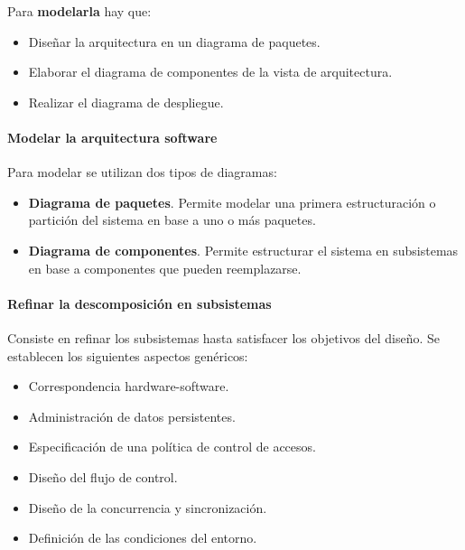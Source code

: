 \documentclass[12pt,spanish]{article}
\begin{document}
Para \textbf{modelarla} hay que:

\begin{itemize}
	\item Diseñar la arquitectura en un diagrama de paquetes.
	\item Elaborar el diagrama de componentes de la vista de arquitectura.
	\item Realizar el diagrama de despliegue.
\end{itemize}

\paragraph{Modelar la arquitectura software\\}

Para modelar se utilizan dos tipos de diagramas:

\begin{itemize}
	\item \textbf{Diagrama de paquetes}. Permite modelar una primera estructuración o partición del sistema en base a uno o más paquetes.
	\item \textbf{Diagrama de componentes}. Permite estructurar el sistema en subsistemas en base a componentes que pueden reemplazarse.
\end{itemize}

\paragraph{Refinar la descomposición en subsistemas\\}

Consiste en refinar los subsistemas hasta satisfacer los objetivos del diseño. Se establecen los siguientes aspectos genéricos:

\begin{itemize}
	\item Correspondencia hardware-software.
	\item Administración de datos persistentes.
	\item Especificación de una política de control de accesos.
	\item Diseño del flujo de control.
	\item Diseño de la concurrencia y sincronización.
	\item Definición de las condiciones del entorno.
\end{itemize}
\end{document}
